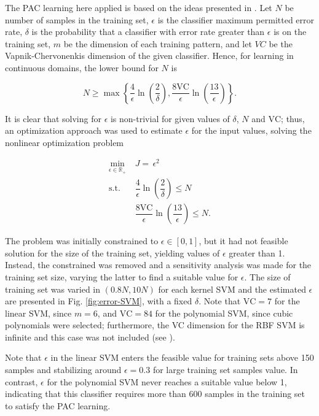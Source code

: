 \documentclass[conference]{IEEEtran}
\theoremstyle{definition}
\theoremstyle{remark}
\theoremstyle{remark}
\begin{document}
The PAC learning here applied is based on the ideas presented in
\parencite{kubat2017}. Let $N$ be number of samples in the training set,
$\epsilon$ is the classifier maximum permitted error rate, $\delta$ is the
probability that a classifier with error rate greater than $\epsilon$ is
 on the training set, $m$ be the dimension of each training
pattern, and let $VC$ be the Vapnik-Chervonenkis dimension of the given
classifier. Hence, for learning in continuous domains, the lower bound for $N$
is

\begin{equation}
  N\geq \max\left\{ \dfrac{4}{\epsilon}\ln\left(\dfrac{2}{\delta}\right),
    \dfrac{8\mathrm{VC}}{\epsilon}\ln\left(\dfrac{13}{\epsilon}\right) \right\}.
\end{equation}

It is clear that solving for $\epsilon$ is non-trivial for given values of
$\delta$, $N$ and $\mathrm{VC}$; thus, an optimization approach was used to
estimate $\epsilon$ for the input values, solving the nonlinear optimization
problem

\begin{equation}
  \begin{split}
    \min_{\epsilon\in\mathbb{R}_+}\ &J=\,\epsilon^2\\
    \mathrm{s.t.}\ &\dfrac{4}{\epsilon}\ln\left(\dfrac{2}{\delta} \right)\leq N\\
    \quad&\dfrac{8\mathrm{VC}}{\epsilon}\ln\left(\dfrac{13}{\epsilon}\right)\leq N.
  \end{split}
\end{equation}

The problem was initially constrained to $\epsilon\in[0,1]$, but it had not
feasible solution for the size of the training set, yielding values of
$\epsilon$ greater than 1. Instead, the constrained was removed and a
sensitivity analysis was made for the training set size, varying the latter to
find a suitable value for $\epsilon$. The size of training set was varied in
$(0.8N, 10N)$ for each kernel SVM and the estimated $\epsilon$ are presented in
Fig. \ref{fig:error-SVM}, with a fixed $\delta$. Note that $\mathrm{VC}=7$ for
the linear SVM, since $m=6$, and $\mathrm{VC}=84$ for the polynomial SVM, since
cubic polynomials were selected; furthermore, the VC dimension for the RBF SVM
is infinite and this case was not included (see \parencite{burges1998}).

Note that $\epsilon$ in the linear SVM enters the feasible value for training
sets above 150 samples and stabilizing around $\epsilon=0.3$ for large training
set samples value. In contrast, $\epsilon$ for the polynomial SVM never reaches
a suitable value below 1, indicating that this classifier requires more than 600
samples in the training set to satisfy the PAC learning.
\end{document}
